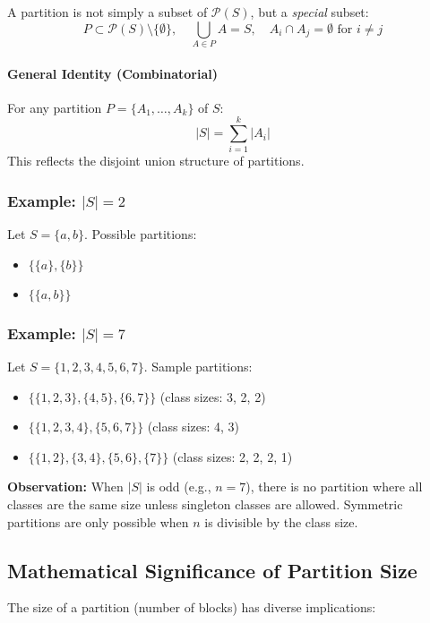 \documentclass[10pt]{article}
\theoremstyle{plain}
\theoremstyle{definition}
\begin{document}
	A partition is not simply a subset of $\mathcal{P}(S)$, but a \emph{special} subset:
	\[
	P \subset \mathcal{P}(S) \setminus \{\emptyset\}, \quad \bigcup_{A \in P} A = S, \quad A_i \cap A_j = \emptyset \text{ for } i \ne j
	\]
	
	\paragraph{General Identity (Combinatorial)}
	For any partition $P = \{A_1, \ldots, A_k\}$ of $S$:
	\[
	|S| = \sum_{i=1}^{k} |A_i|
	\]
	This reflects the disjoint union structure of partitions.
	
	\subsubsection*{Example: $|S| = 2$}
	Let $S = \{a, b\}$.
	Possible partitions:
	\begin{itemize}
		\item $\{\{a\}, \{b\}\}$
		\item $\{\{a,b\}\}$
	\end{itemize}
	
	\subsubsection*{Example: $|S| = 7$}
	Let $S = \{1,2,3,4,5,6,7\}$. Sample partitions:
	\begin{itemize}
		\item $\{\{1,2,3\}, \{4,5\}, \{6,7\}\}$ \hfill (class sizes: 3, 2, 2)
		\item $\{\{1,2,3,4\}, \{5,6,7\}\}$ \hfill (class sizes: 4, 3)
		\item $\{\{1,2\}, \{3,4\}, \{5,6\}, \{7\}\}$ \hfill (class sizes: 2, 2, 2, 1)
	\end{itemize}
	
	\textbf{Observation:} When $|S|$ is odd (e.g., $n = 7$), there is no partition where all classes are the same size unless singleton classes are allowed. Symmetric partitions are only possible when $n$ is divisible by the class size.
	
	\subsection*{Mathematical Significance of Partition Size}
	
	The size of a partition (number of blocks) has diverse implications:
	
\end{document}
